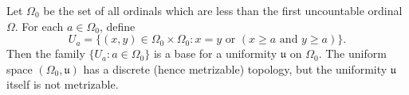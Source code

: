 \begin{definition}
Let $\Omega_0$ be the set of all ordinals which are less than the first uncountable ordinal $\Omega$. For each $a \in \Omega_0$, define
\[
U_a = \{(x, y) \in \Omega_0 \times \Omega_0 : x = y \text{ or } (x \geq a \text{ and } y \geq a)\}.
\]
Then the family $\{U_a : a \in \Omega_0\}$ is a base for a uniformity $\mathfrak{u}$ on $\Omega_0$. The uniform space $(\Omega_0, \mathfrak{u})$ has a discrete (hence metrizable) topology, but the uniformity $\mathfrak{u}$ itself is not metrizable.
\end{definition}
